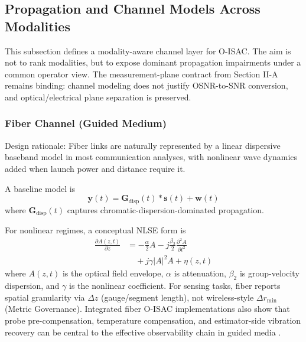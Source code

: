 \documentclass[letterpaper,journal]{IEEEtran}
\begin{document}
\subsection{Propagation and Channel Models Across Modalities}
This subsection defines a modality-aware channel layer for O-ISAC. The aim is not to rank modalities, but to expose dominant propagation impairments under a common operator view. The measurement-plane contract from Section II-A remains binding: channel modeling does not justify OSNR-to-SNR conversion, and optical/electrical plane separation is preserved.

\subsubsection{Fiber Channel (Guided Medium)}
Design rationale: Fiber links are naturally represented by a linear dispersive baseband model in most communication analyses, with nonlinear wave dynamics added when launch power and distance require it.

A baseline model is
\begin{equation}
    \mathbf{y}(t)=\mathbf{G}_{\mathrm{disp}}(t)\ast \mathbf{s}(t)+\mathbf{w}(t)
    \label{eq:fiber_linear_model}
\end{equation}
where $\mathbf{G}_{\mathrm{disp}}(t)$ captures chromatic-dispersion-dominated propagation.

For nonlinear regimes, a conceptual NLSE form is
\begin{equation}
    \begin{split}
        \frac{\partial A(z,t)}{\partial z}
         & =
        -\frac{\alpha}{2}A
        -j\frac{\beta_2}{2}\frac{\partial^2 A}{\partial t^2} \\
         & \quad
        +j\gamma |A|^2 A
        +\eta(z,t)
    \end{split}
    \label{eq:nlse_conceptual}
\end{equation}
where $A(z,t)$ is the optical field envelope, $\alpha$ is attenuation, $\beta_2$ is group-velocity dispersion, and $\gamma$ is the nonlinear coefficient. For sensing tasks, fiber reports spatial granularity via $\Delta z$ (gauge/segment length), not wireless-style $\Delta r_{\min}$ (Metric Governance). Integrated fiber O-ISAC implementations also show that probe pre-compensation, temperature compensation, and estimator-side vibration recovery can be central to the effective observability chain in guided media \cite{O_ISAC_024,O_ISAC_032,O_ISAC_072,O_ISAC_085}.
\end{document}
